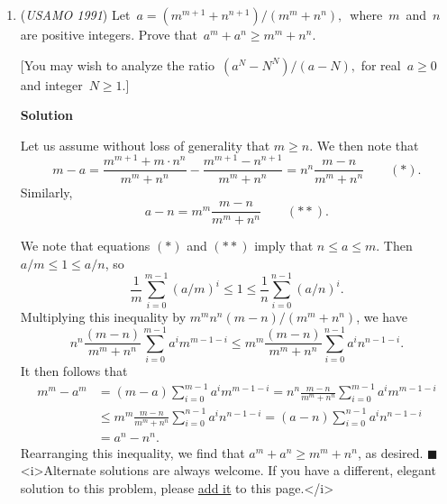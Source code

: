 \begin{enumerate}
 
 \[2^{a_m} = 2^{a_{m + 1}} = 2^{a_{m + 2}} = \cdots \pmod{n + 1},\]

 or equivalently

 
 \[a_{m + 1} = a_{m + 2} = a_{m + 3} = \cdots \pmod{n + 1},\]

 which is what we wanted to show.

 Now suppose that $n + 1$ is even. Write $n + 1 = 2^{k} \cdot s$, where $1 \leq s < n + 1$ is odd. The series must eventually be constant $\textrm{mod\ } 2^k$, since $a_m = 0 \textrm{\ mod\ } {2^k}$ for large enough $m$. And by our inductive hypothesis, the series must also eventually be constant $\textrm{mod\ } s$. So for large enough $m$, 

 
 \[a_m = a_{m + 1} = a_{m + 2} = \cdots \pmod{2^k},\]
 \[a_m = a_{m + 1} = a_{m + 2} = \cdots \pmod{s}.\]

 Since $2^k$ and $s$ are coprime, these equations are also true modulo $2^k \cdot s = n + 1$. So

 
 \[a_m = a_{m + 1} = a_{m + 2} = \cdots \pmod{n + 1},\]

 which completes the proof.

 


	\item (\textit{USAMO 1991}) Let $\, a =(m^{m+1} + n^{n+1})/(m^m + n^n), \,$ where $\,m\,$ and $\,n\,$ are positive integers.  Prove that $\,a^m + a^n \geq m^m + n^n$.


 [You may wish to analyze the ratio $\,(a^N - N^N)/(a-N),$ for real $\, a \geq 0 \,$ and integer $\, N \geq 1$.]


 



\textbf{Solution}

Let us assume without loss of generality that $m\ge n$.  We then note that
 \[m-a = \frac{m^{m+1} + m \cdot n^n}{m^m+n^n} - \frac{m^{m+1} - n^{n+1}}{m^m+n^n} = n^n \frac{m-n}{m^m+n^n} \qquad (*) .\]Similarly,
 \[a-n = m^m \frac{m-n}{m^m+n^n} \qquad (**) .\]

 We note that equations $(*)$ and $(**)$ imply that $n \le a \le m$.  Then $a/m \le 1 \le a/n$, so
 \[\frac{1}{m} \sum_{i=0}^{m-1} (a/m)^i \le 1 \le \frac{1}{n} \sum_{i=0}^{n-1} (a/n)^i .\]Multiplying this inequality by $m^m n^n(m-n)/(m^m+n^n)$, we have
 \[n^n \frac{(m-n)}{m^m+n^n} \sum_{i=0}^{m-1} a^i m^{m-1-i} \le m^m \frac{(m-n)}{m^m+n^n} \sum_{i=0}^{n-1} a^i n^{n-1-i} .\]It then follows that
 \begin{align*} m^m - a^m &= (m-a) \sum_{i=0}^{m-1} a^i m^{m-1-i} = n^n \frac{m-n}{m^m+n^n} \sum_{i=0}^{m-1} a^i m^{m-1-i} \\ &\le m^m \frac{m-n}{m^m+n^n} \sum_{i=0}^{n-1} a^i n^{n-1-i} = (a-n) \sum_{i=0}^{n-1} a^i n^{n-1-i} \\ &= a^n - n^n . \end{align*}
Rearranging this inequality, we find that $a^m + a^n \ge m^m + n^n$, as desired.  $\blacksquare$
<i>Alternate solutions are always welcome. If you have a different, elegant solution to this problem, please \href{https://artofproblemsolving.com/wiki/index.php?title=1991\_USAMO\_Problems/Problem\_4&action=edit}{add it} to this page.</i>




\end{enumerate}
